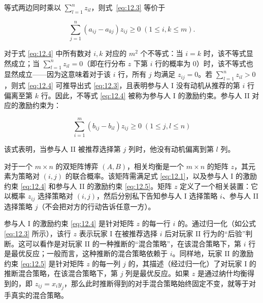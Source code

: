 等式两边同时乘以 \(\mathop{\sum }\limits_{{l = 1}}^{n}{z}_{il}\)，则式~\eqref{eq:12.3} 等价于

\begin{equation}
\mathop{\sum }\limits_{{j = 1}}^{n}\left( {{a}_{ij} - {a}_{kj}}\right) {z}_{ij} \geq  0\;\left( {1 \leq  i,k \leq  m}\right) . \label{eq:12.4}
\end{equation}

对于式 \eqref{eq:12.4} 中所有数对 $i,k$ 对应的 $m^2$ 个不等式：当 $i = k$ 时，该不等式显然成立；当 $\sum\limits_{l=1}^{n} z_{il} = 0$（即在行分布 $z$ 下第 $i$ 行的概率为 0）时，该不等式也显然成立——因为这意味着对于该 $i$ 行，所有 $j$ 均满足 $z_{ij} = 0$。若 $\sum\limits_{l=1}^{n} z_{il} > 0$，则式 \eqref{eq:12.4} 可推导出式 \eqref{eq:12.3}，且表明参与人 I 没有动机从推荐的第 $i$ 行偏离至第 $k$ 行。因此，不等式 \eqref{eq:12.4} 被称为参与人 I 的激励约束。参与人 II 对应的激励约束为：

\begin{equation}
\mathop{\sum }\limits_{{i = 1}}^{m}\left( {{b}_{ij} - {b}_{il}}\right) {z}_{ij} \geq  0\;\left( {1 \leq  j,l \leq  n}\right)  \label{eq:12.5}
\end{equation}

该式表明，当参与人 II 被推荐选择第 \(j\) 列时，他没有动机偏离到第 \(l\) 列。

\begin{definition}[两人博弈的相关均衡]\label{def:12.1}
对于一个 \(m \times n\) 的双矩阵博弈 \((A, B)\)，相关均衡是一个 \(m \times n\) 的矩阵 \(z\)，其元素为策略对 \((i,j)\) 的联合概率。该矩阵需满足式 \eqref{eq:12.1}，以及参与人 I 的激励约束 \eqref{eq:12.4} 和参与人 II 的激励约束 \eqref{eq:12.5}。矩阵 \(z\) 定义了一个相关装置：它以概率 \(z_{ij}\) 选择策略对 \((i, j)\)，然后分别私下告知参与人 I 选择策略 \(i\)、参与人 II 选择策略 \(j\)（不会把对方的行动告诉任意一方）。
\end{definition}
参与人 \(\mathrm{I}\) 的激励约束 \eqref{eq:12.4} 是针对矩阵 \(z\) 的每一行 \(i\) 的。通过归一化（如公式 \eqref{eq:12.3} 所示），该行 \(z\) 表示玩家 I 在被推荐选择 \(i\) 后对玩家 II 行为的“后验”判断。这可以看作是对玩家 II 的一种推断的“混合策略”，在该混合策略下，第 \(i\) 行是最优反应；一般而言，这种推断的混合策略依赖于 \(i\)。同样地，玩家 II 的激励约束 \eqref{eq:12.5} 是针对矩阵 \(z\) 的每一列 \(j\) 的，其描述（经过归一化）了对玩家 I 的推断混合策略，在该混合策略下，第 \(j\) 列是最优反应。如果 \(z\) 是通过纳什均衡得到的，即 \({z}_{ij} = {x}_{i}{y}_{j}\)，那么此时推断得到的对手混合策略始终固定不变，就等于对手真实的混合策略。

